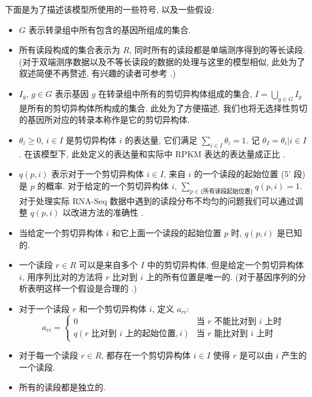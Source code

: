 下面是为了描述该模型所使用的一些符号, 以及一些假设: 
\begin{itemize}
\item $G$ 表示转录组中所有包含的基因所组成的集合. 

\item 所有读段构成的集合表示为 $R$, 同时所有的读段都是单端测序得到的等长读段. 
(对于双端测序数据以及不等长读段的数据的处理与这里的模型相似, 此处为了叙述简便不再赘述, 
有兴趣的读者可参考 .)

\item $I_g$, $g \in G$ 表示基因 $g$ 在转录组中所有的剪切异构体组成的集合, 
$I = \bigcup_{g \in G} I_g$ 是所有的剪切异构体所构成的集合. 
此处为了方便描述, 我们也将无选择性剪切的基因所对应的转录本称作是它的剪切异构体. 

\item $\theta_i \geq 0$, $i \in I$ 是剪切异构体 $i$ 的表达量, 
它们满足 $\sum_{i \in I} \theta_i = 1$. 记 $\theta_I = {\theta_i | i \in I}$.
在该模型下, 此处定义的表达量和实际中 RPKM 表达的表达量成正比 \cite{cufflinks.2010}. 

\item $q(p, i)$ 表示对于一个剪切异构体 $i \in I$, 
来自 $i$ 的一个读段的起始位置 (5' 段) 是 $p$ 的概率. 
对于给定的一个剪切异构体 $i$, 
$\sum_{p \in \{ \text{所有读段起始位置} \}} q(p, i) = 1$. 
对于处理实际 RNA-Seq 数据中遇到的读段分布不均匀的问题我们可以通过调整 $q(p,i)$ 
以改进方法的准确性 \cite{roberts2011improving}. 

\item 当给定一个剪切异构体 $i$ 和它上面一个读段的起始位置 $p$ 时, 
$q(p, i)$ 是已知的. 

\item 一个读段 $r \in R$ 可以是来自多个 $I$ 中的剪切异构体, 
但是给定一个剪切异构体 $i$, 
用序列比对的方法将 $r$ 比对到 $i$ 上的所有位置是唯一的. 
(对于基因序列的分析表明这样一个假设是合理的 \cite{peng2011t}.) 

\item 对于一个读段 $r$ 和一个剪切异构体 $i$, 定义 $a_{ri}$: 
\[
a_{ri} = \begin{cases}
0 & \text{当 $r$ 不能比对到 $i$ 上时} \\
q(\text{$r$ 比对到 $i$ 上的起始位置},i) & \text{当 $r$ 能比对到 $i$ 上时} \end{cases}
\]

\item 对于每一个读段 $r \in R$, 
都存在一个剪切异构体 $i \in I$ 使得 $r$ 是可以由 $i$ 产生的一个读段. 

\item 所有的读段都是独立的. 
\end{itemize}

